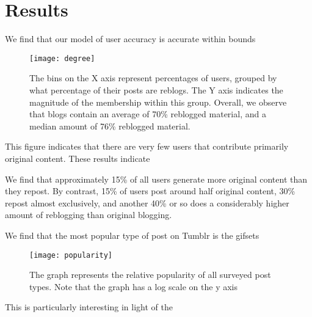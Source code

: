 \section{Results}
\label{sec:-res}
We find that our model of user accuracy is accurate within bounds
%  

\begin{figure}[bht]
\centering
 \texttt{[image: degree]}
  \caption{The bins on the X axis represent percentages of users, grouped by what percentage of their posts are reblogs.  The Y axis indicates the magnitude of the membership within this group.  Overall, we observe that blogs contain an average of 70\% reblogged material, and a median amount of 76\% reblogged material.}
  \label{fig:-deg}
\end{figure}

This figure indicates that there are very few users that contribute 
primarily original content.  These results indicate 

We find that approximately 15\% of all users generate more original 
content than they repost.  By contrast, 15\% of users post around half 
original content, 30\% repost almost exclusively, and another 40\% or 
so does a considerably higher amount of reblogging than original 
blogging.

We find that the most popular type of post on Tumblr is the
gifsets\cite{hillman2014tumblr}

\begin{figure}[bht]
\centering
 \texttt{[image: popularity]}
  \caption{The graph represents the relative popularity of all surveyed post types.  Note that the graph has a log scale on the y axis}
  \label{fig:-pop}
\end{figure}
This is particularly interesting in light of the 

